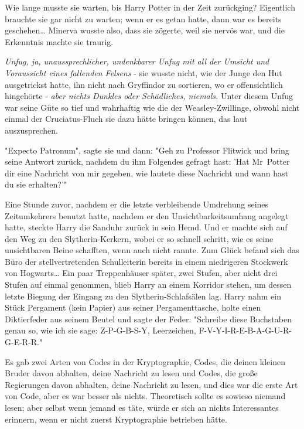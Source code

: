 {Wie lange musste sie warten, bis Harry Potter in der Zeit zurückging? Eigentlich brauchte sie gar nicht zu warten; wenn er es getan hatte, dann war es bereits geschehen… Minerva wusste also, dass sie zögerte, weil sie nervös war, und die Erkenntnis machte sie traurig.

\emph{Unfug, ja, unaussprechlicher, undenkbarer Unfug mit all der Umsicht und Voraussicht eines fallenden Felsens} - sie wusste nicht, wie der Junge den Hut ausgetrickst hatte, ihn nicht nach Gryffindor zu sortieren, wo er offensichtlich hingehörte - \emph{aber nichts Dunkles oder Schädliches, niemals.} Unter diesem Unfug war seine Güte so tief und wahrhaftig wie die der Weasley-Zwillinge, obwohl nicht einmal der Cruciatus-Fluch sie dazu hätte bringen können, das laut auszusprechen.

"Expecto Patronum", sagte sie und dann: "Geh zu Professor Flitwick und bring seine Antwort zurück, nachdem du ihm Folgendes gefragt hast: 'Hat Mr~Potter dir eine Nachricht von mir gegeben, wie lautete diese Nachricht und wann hast du sie erhalten?'"

Eine Stunde zuvor, nachdem er die letzte verbleibende Umdrehung seines Zeitumkehrers benutzt hatte, nachdem er den Unsichtbarkeitsumhang angelegt hatte, steckte Harry die Sanduhr zurück in sein Hemd. Und er machte sich auf den Weg zu den Slytherin-Kerkern, wobei er so schnell schritt, wie es seine unsichtbaren Beine schafften, wenn auch nicht rannte. Zum Glück befand sich das Büro der stellvertretenden Schulleiterin bereits in einem niedrigeren Stockwerk von Hogwarts… Ein paar Treppenhäuser später, zwei Stufen, aber nicht drei Stufen auf einmal genommen, blieb Harry an einem Korridor stehen, um dessen letzte Biegung der Eingang zu den Slytherin-Schlafsälen lag. Harry nahm ein Stück Pergament (kein Papier) aus seiner Pergamenttasche, holte einen Diktierfeder aus seinem Beutel und sagte der Feder: "Schreibe diese Buchstaben genau so, wie ich sie sage: Z-P-G-B-S-Y, Leerzeichen, F-V-Y-I-R-E-B-A-G-U-R-G-E-R-R."

Es gab zwei Arten von Codes in der Kryptographie, Codes, die deinen kleinen Bruder davon abhalten, deine Nachricht zu lesen und Codes, die große Regierungen davon abhalten, deine Nachricht zu lesen, und dies war die erste Art von Code, aber es war besser als nichts. Theoretisch sollte es sowieso niemand lesen; aber selbst wenn jemand es täte, würde er sich an nichts Interessantes erinnern, wenn er nicht zuerst Kryptographie betrieben hätte.

}
